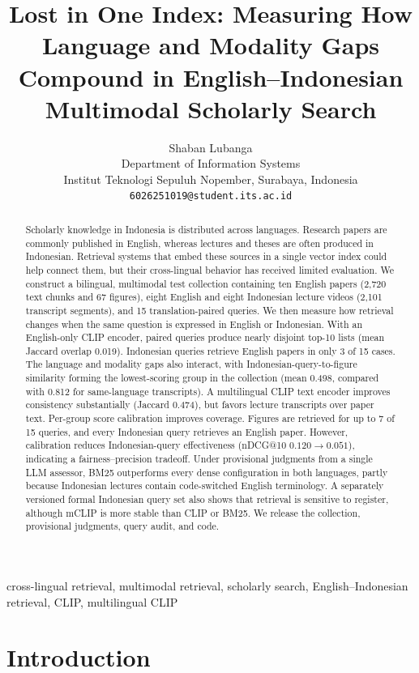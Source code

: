 \documentclass[conference]{IEEEtran}
\title{Lost in One Index: Measuring How Language and Modality Gaps\\
Compound in English--Indonesian Multimodal Scholarly Search}
\author{Shaban Lubanga\\
Department of Information Systems\\
Institut Teknologi Sepuluh Nopember, Surabaya, Indonesia\\
\texttt{6026251019@student.its.ac.id}}
\date{}
\begin{document}
\maketitle

\begin{abstract}
Scholarly knowledge in Indonesia is distributed across languages. Research
papers are commonly published in English, whereas lectures and theses are
often produced in Indonesian. Retrieval systems that embed these sources in
a single vector index could help connect them, but their cross-lingual
behavior has received limited evaluation. We construct a bilingual,
multimodal test collection containing ten English papers (2{,}720 text
chunks and 67 figures), eight English and eight Indonesian lecture videos
(2{,}101 transcript segments), and 15 translation-paired queries. We then
measure how retrieval changes when the same question is expressed in English
or Indonesian. With an English-only CLIP encoder, paired queries produce
nearly disjoint top-10 lists (mean Jaccard overlap 0.019). Indonesian queries
retrieve English papers in only 3 of 15 cases. The language and modality gaps
also interact, with Indonesian-query-to-figure similarity forming the
lowest-scoring group in the collection (mean 0.498, compared with 0.812 for
same-language transcripts). A multilingual CLIP text encoder improves
consistency substantially (Jaccard 0.474), but favors lecture transcripts
over paper text. Per-group score calibration improves coverage. Figures are
retrieved for up to 7 of 15 queries, and every Indonesian query retrieves an
English paper. However, calibration reduces Indonesian-query effectiveness
(nDCG@10 $0.120 \rightarrow 0.051$), indicating a fairness--precision
tradeoff. Under provisional judgments from a single LLM assessor, BM25
outperforms every dense configuration in both languages, partly because
Indonesian lectures contain code-switched English terminology. A separately
versioned formal Indonesian query set also shows that retrieval is sensitive
to register, although mCLIP is more stable than CLIP or BM25. We release the
collection, provisional judgments, query audit, and code.
\end{abstract}

\begin{IEEEkeywords}
cross-lingual retrieval, multimodal retrieval, scholarly search,
English--Indonesian retrieval, CLIP, multilingual CLIP
\end{IEEEkeywords}

\section{Introduction}
\end{document}

